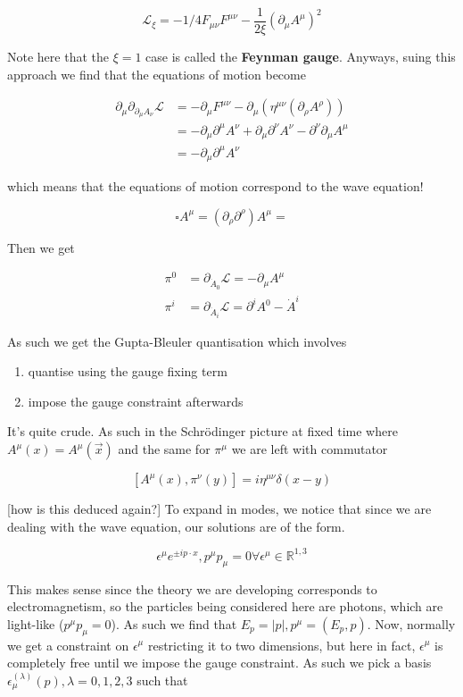 \documentclass{article}
\theoremstyle{definition}
\begin{document}
$$ \mathcal{L}_\xi = -1/4 F_{\mu \nu} F^{\mu \nu} - \frac{1}{2 \xi}
(\partial_\mu A^\mu)^2 $$

Note here that the $\xi = 1$ case is called the \textbf{Feynman gauge}. Anyways,
suing this approach we find that the equations of motion become

\begin{align*}
\partial_\mu \partial_{\partial_\mu A_\nu} \mathcal{L} &=
-\partial_\mu F^{\mu \nu} - \partial_\mu (\eta^{\mu \nu} (\partial_\rho A^\rho)) \\
&= -\partial_\mu \partial^\mu A^\nu + \partial_\mu \partial^\nu A^\nu - \partial^\nu \partial_\mu A^\mu \\
&= -\partial_\mu \partial^\mu A^\nu
\end{align*}

which means that the equations of motion correspond to the wave equation!

$$ \square A^\mu = (\partial_\rho \partial^\rho) A^\mu = $$

Then we get

\begin{align*}
\pi^0 &= \partial_{\dot{A}_0} \mathcal{L} = -\partial_\mu A^\mu \\
\pi^i &= \partial_{\dot{A}_i} \mathcal{L} = \partial^i A^0 - \dot{A}^i
\end{align*}

As such we get the Gupta-Bleuler quantisation which involves

\begin{enumerate}
\item quantise using the gauge fixing term
\item impose the gauge constraint afterwards
\end{enumerate}

It's quite crude. As such in the Schr\"{o}dinger picture at fixed time where
$A^\mu(x) = A^\mu(\vec{x})$ and the same for $\pi^\mu$ we are left with
commutator

$$ [A^\mu(x), \pi^\nu(y)] = i\eta^{\mu \nu} \delta(x - y) $$

[how is this deduced again?] To expand in modes, we notice that since we are
dealing with the wave equation, our solutions are of the form.

$$ \epsilon^\mu e^{\pm i p \cdot x}, p^\mu p_\mu = 0 \forall \epsilon^\mu \in
\mathbb{R}^{1, 3} $$

This makes sense since the theory we are developing corresponds to
electromagnetism, so the particles being considered here are photons, which are
light-like ($p^\mu p_\mu = 0$). As such we find that $E_p = |p|, p^\mu = (E_p,
p)$. Now, normally we get a constraint on $\epsilon^\mu$ restricting it to two
dimensions, but here in fact, $\epsilon^\mu$ is completely free until we impose
the gauge constraint. As such we pick a basis $\epsilon_\mu^{(\lambda)}(p),
\lambda=0, 1, 2, 3$ such that
\end{document}
